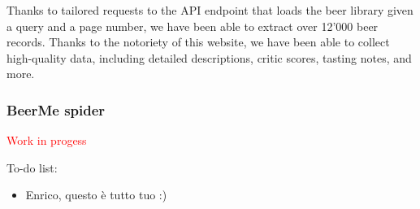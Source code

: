 Thanks to tailored requests to the API endpoint that loads the beer library given a query and a page number, we have been able to extract over 12'000 beer records. Thanks to the notoriety of this website, we have been able to collect high-quality data, including detailed descriptions, critic scores, tasting notes, and more.

\subsubsection{BeerMe spider}

\textcolor{red}{Work in progess}

To-do list:

\begin{itemize}
  \item Enrico, questo è tutto tuo :)
\end{itemize}
